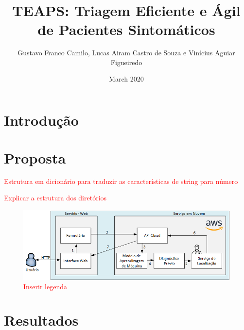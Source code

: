 \documentclass[12pt]{article}
\title{TEAPS: Triagem Eficiente e Ágil de Pacientes Sintomáticos}
\author{Gustavo Franco Camilo, Lucas Airam Castro de Souza e Vinícius Aguiar Figueiredo}
\date{March 2020}
\begin{document}
\maketitle



\begin{resumo}
\end{resumo}

\section{Introdução}
\label{sec:introducao}



\section{Proposta}
\label{sec:proposta}

\textcolor{red}{Estrutura em dicionário para traduzir as características de string para número}

\textcolor{red}{Explicar a estrutura dos diretórios}

\begin{figure}[tbh!]
    \centering
    \includegraphics[width=1\textwidth]{figuras/arquitetura.png}
    \caption{\textcolor{red}{Inserir legenda}}
    \label{fig:diagrama-antes}
\end{figure}



\section{Resultados}
\label{sec:resultados}



\nocite{*}



\end{document}
